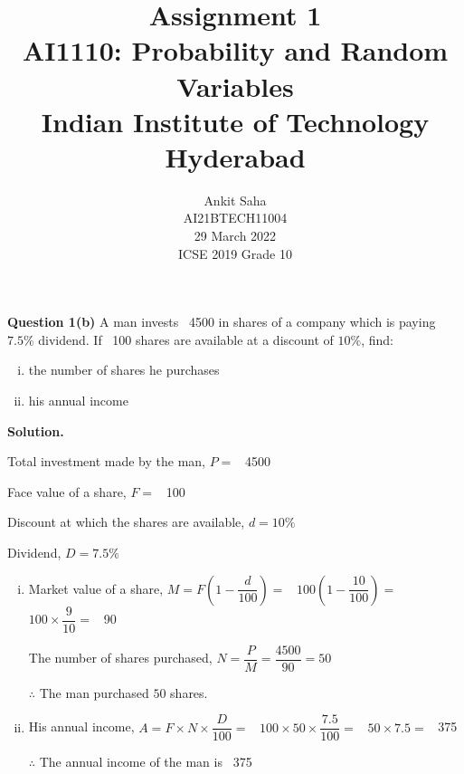 \documentclass[journal,12pt,onecolumn]{IEEEtran}
\title{Assignment 1 \\ \Large AI1110: Probability and Random Variables \\ \large Indian Institute of Technology Hyderabad}
\author{Ankit Saha \\ \normalsize AI21BTECH11004 \\ \vspace*{20pt} \normalsize  29 March 2022 \\ \vspace*{20pt} \Large ICSE 2019 Grade 10}
\begin{document}
	\maketitle
	
	\textbf{Question 1(b)} 
	A man invests \rupee~4500 in shares of a company which is paying $7.5\%$ dividend. If \rupee~100 shares are available at a discount of $10\%$, find:
	\begin{enumerate}[(i)]
		\item the number of shares he purchases
		\item his annual income
	\end{enumerate}
	
	\vspace*{10pt}
	
	\textbf{Solution.}
	
	Total investment made by the man, $P = $ \rupee~4500
	
	Face value of a share, $F = $ \rupee~100
	
	Discount at which the shares are available, $d = 10\%$
	
	Dividend, $D = 7.5\%$
	
	\vspace*{5pt}	
	
	\begin{enumerate}[(i)]
		\item Market value of a share, $M = F \left(1 - \dfrac{d}{100} \right) = $ \rupee~$100 \left(1 - \dfrac{10}{100} \right) = $ \rupee~$100 \times \dfrac{9}{10} = $ \rupee~90
		\vspace*{5pt}
		
		The number of shares purchased, $N = \dfrac{P}{M} = \dfrac{4500}{90} = 50$
		\vspace*{7pt}
		
		$\therefore$ The man purchased $50$ shares.
		
		\vspace*{10pt}
		\item His annual income, $A = F \times N \times \dfrac{D}{100} = $ \rupee~$100 \times 50 \times \dfrac{7.5}{100} = $ \rupee~$50 \times 7.5 = $ \rupee~375
		\vspace*{7pt}
		
		$\therefore$ The annual income of the man is \rupee~375		
		
	\end{enumerate}
	
\end{document}
